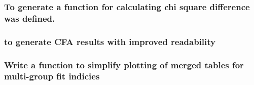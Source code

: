 \documentclass[
]{article}
\begin{document}
\hypertarget{to-generate-a-function-for-calculating-chi-square-difference-was-defined.}{%
\subsubsection{To generate a function for calculating chi square difference was defined.}\label{to-generate-a-function-for-calculating-chi-square-difference-was-defined.}}

\hypertarget{to-generate-cfa-results-with-improved-readability}{%
\subsubsection{to generate CFA results with improved readability}\label{to-generate-cfa-results-with-improved-readability}}

\hypertarget{write-a-function-to-simplify-plotting-of-merged-tables-for-multi-group-fit-indicies}{%
\subsubsection{Write a function to simplify plotting of merged tables for multi-group fit indicies}\label{write-a-function-to-simplify-plotting-of-merged-tables-for-multi-group-fit-indicies}}
\end{document}
